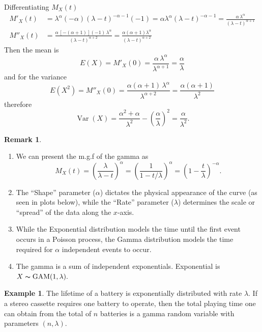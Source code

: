 \documentclass[12pt,a4paper]{report}
\theoremstyle{definition}
\newtheorem{example}[thm]{Example}
\newtheorem{remark}[thm]{Remark}
\theoremstyle{plain}
\theoremstyle{definition}
\begin{document}
Differentiating $M_X(t)$
\begin{align*}
M'_X(t) &  = \lambda^{\alpha}(-\alpha)(\lambda -t)^{-\alpha -1}(-1) = \alpha \lambda^{\alpha}(\lambda -t)^{-\alpha-1} = \frac{\alpha\, \lambda^{\alpha}}{(\lambda - t)^{\alpha + 1}}\\ 
M''_X(t) & = \frac{\alpha \, [-(\alpha + 1)](-1)\,\lambda^{\alpha}}{(\lambda - t)^{\alpha + 2}}=\frac{\alpha (\alpha + 1) \lambda^{\alpha}}{(\lambda - t)^{\alpha + 2}}
\end{align*}
Then the mean is 
\[E(X) = M'_X(0) = \frac{\alpha\, \lambda^{\alpha}}{\lambda^{\alpha + 1}}= \frac{\alpha}{\lambda}\]
and  for the  variance  
\[E(X^2) = M''_X(0) = \frac{\alpha(\alpha + 1) \, \lambda^{\alpha}}{\lambda^{\alpha + 2}} = \frac{\alpha (\alpha + 1)}{\lambda^{2}}\]
therefore
\[\operatorname{Var}(X) = \frac{\alpha^2 + \alpha}{\lambda^2} - \left(\frac{\alpha}{\lambda}\right)^2= \frac{\alpha}{\lambda^2}.\]






\begin{remark}
\textbf{ }
\begin{enumerate}
\item We can present the m.g.f of the gamma as \[M_X(t)=\left(\frac{\lambda}{\lambda -t}\right)^{\alpha}=\left(\frac{1}{1-t/\lambda}\right)^{\alpha}=\left(1-\frac{t}{\lambda}\right)^{-\alpha}.\]
\item The ``Shape'' parameter ($\alpha$) dictates the physical appearance of the curve (as seen in plots below), while the ``Rate'' parameter ($\lambda$) determines the scale or ``spread'' of the data along the $x$-axis.
\item While the Exponential distribution models the time until the first event occurs in a Poisson process, the Gamma distribution models the time required for $\alpha$ independent events to occur.
\item The gamma is a sum of independent exponentials. Exponential is  $X\thicksim \operatorname{GAM}(1,\lambda).$
\end{enumerate}
\end{remark}


\begin{example}
The lifetime of a battery is exponentially distributed with rate $\lambda$. If a stereo cassette requires one battery to operate, then the total playing time one can obtain from the total of $n$ batteries is a gamma random variable with parameters $(n,\lambda)$.
\end{example}
\end{document}
